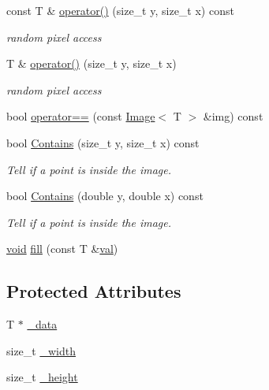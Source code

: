 \begin{DoxyCompactItemize}
const T \& \hyperlink{classImage_a172d2dfb12c97589c01f6cf36afea627}{operator()} (size\+\_\+t y, size\+\_\+t x) const 
\begin{DoxyCompactList}\small\item\em random pixel access \end{DoxyCompactList}\item 
T \& \hyperlink{classImage_a31002b200e1ffde294273ebb90cc0a02}{operator()} (size\+\_\+t y, size\+\_\+t x)
\begin{DoxyCompactList}\small\item\em random pixel access \end{DoxyCompactList}\item 
bool \hyperlink{classImage_af60b4a0a3a7818b1411a4cbcad59ce26}{operator==} (const \hyperlink{classImage}{Image}$<$ T $>$ \&img) const 
\item 
bool \hyperlink{classImage_a45eb1e216574191cdce62e545bc11550}{Contains} (size\+\_\+t y, size\+\_\+t x) const 
\begin{DoxyCompactList}\small\item\em Tell if a point is inside the image. \end{DoxyCompactList}\item 
bool \hyperlink{classImage_a24e2196e8a4eb09c7a7a4c7263f34921}{Contains} (double y, double x) const 
\begin{DoxyCompactList}\small\item\em Tell if a point is inside the image. \end{DoxyCompactList}\item 
\hyperlink{png_8h_aa8c59027f9ab2769342f248709d68d17}{void} \hyperlink{classImage_acee82adf192afb203322716e69abb333}{fill} (const T \&\hyperlink{jpeglib_8h_aa0ccb5ee6d882ee3605ff47745c6467b}{val})
\end{DoxyCompactItemize}
\subsection*{Protected Attributes}
\begin{DoxyCompactItemize}
\item 
T $\ast$ \hyperlink{classImage_a8840ba0393a40cbe7cc7b068c9cf7a3a}{\+\_\+data}
\item 
size\+\_\+t \hyperlink{classImage_ac8b95e3c2a725ef222ba9b84c9fe92b1}{\+\_\+width}
\item 
size\+\_\+t \hyperlink{classImage_a29f681d826e113d2c4b20d91577ee9ae}{\+\_\+height}
\end{DoxyCompactItemize}
